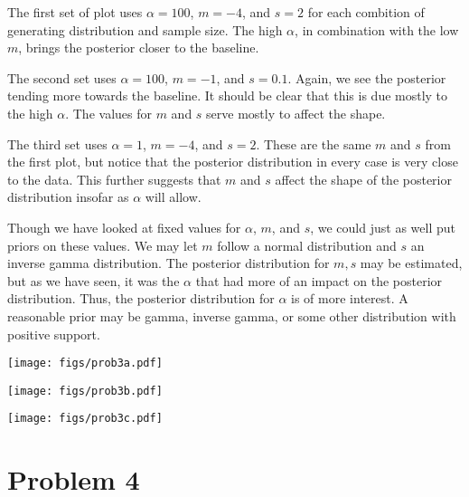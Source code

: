 \documentclass[12pt]{article}
\begin{document}
\noindent The first set of plot uses $\alpha=100$, $m=-4$, and $s=2$ for each combition of generating distribution and sample size. The high $\alpha$, in combination with the low $m$, brings the posterior closer to the baseline.
\bigskip

\noindent The second set uses $\alpha=100$, $m=-1$, and $s=0.1$. Again, we see the posterior tending more towards the baseline. It should be clear that this is due mostly to the high $\alpha$. The values for $m$ and $s$ serve mostly to affect the shape.
\bigskip

\noindent The third set uses $\alpha=1$, $m=-4$, and $s=2$. These are the same $m$ and $s$ from the first plot, but notice that the posterior distribution in every case is very close to the data. This further suggests that $m$ and $s$ affect the shape of the posterior distribution insofar as $\alpha$ will allow. 
\bigskip

\noindent Though we have looked at fixed values for $\alpha$, $m$, and $s$, we could just as well put priors on these values. We may let $m$ follow a normal distribution and $s$ an inverse gamma distribution. The posterior distribution for $m, s$ may be estimated, but as we have seen, it was the $\alpha$ that had more of an impact on the posterior distribution. Thus, the posterior distribution for $\alpha$ is of more interest. A reasonable prior may be gamma, inverse gamma, or some other distribution with positive support.

\newpage

\begin{center}
\texttt{[image: figs/prob3a.pdf]}
\end{center}

\newpage

\begin{center}
\texttt{[image: figs/prob3b.pdf]}
\end{center}

\newpage

\begin{center}
\texttt{[image: figs/prob3c.pdf]}
\end{center}

\newpage

\section*{Problem 4}
\end{document}
